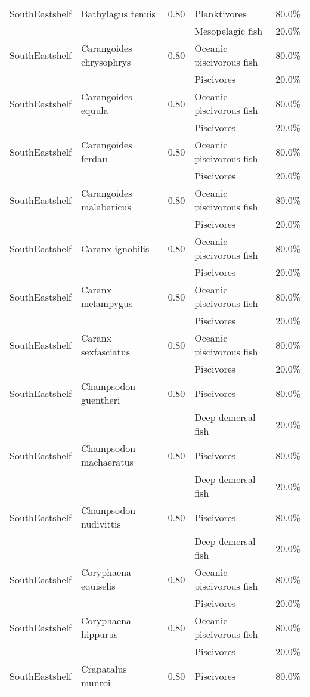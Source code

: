 \begin{longtable}{llcll}
\hline
SouthEastshelf & Bathylagus tenuis & 0.80 & Planktivores & 80.0\% \\
& & & Mesopelagic fish & 20.0\% \\
\hline
SouthEastshelf & Carangoides chrysophrys & 0.80 & Oceanic piscivorous fish & 80.0\% \\
& & & Piscivores & 20.0\% \\
\hline
SouthEastshelf & Carangoides equula & 0.80 & Oceanic piscivorous fish & 80.0\% \\
& & & Piscivores & 20.0\% \\
\hline
SouthEastshelf & Carangoides ferdau & 0.80 & Oceanic piscivorous fish & 80.0\% \\
& & & Piscivores & 20.0\% \\
\hline
SouthEastshelf & Carangoides malabaricus & 0.80 & Oceanic piscivorous fish & 80.0\% \\
& & & Piscivores & 20.0\% \\
\hline
SouthEastshelf & Caranx ignobilis & 0.80 & Oceanic piscivorous fish & 80.0\% \\
& & & Piscivores & 20.0\% \\
\hline
SouthEastshelf & Caranx melampygus & 0.80 & Oceanic piscivorous fish & 80.0\% \\
& & & Piscivores & 20.0\% \\
\hline
SouthEastshelf & Caranx sexfasciatus & 0.80 & Oceanic piscivorous fish & 80.0\% \\
& & & Piscivores & 20.0\% \\
\hline
SouthEastshelf & Champsodon guentheri & 0.80 & Piscivores & 80.0\% \\
& & & Deep demersal fish & 20.0\% \\
\hline
SouthEastshelf & Champsodon machaeratus & 0.80 & Piscivores & 80.0\% \\
& & & Deep demersal fish & 20.0\% \\
\hline
SouthEastshelf & Champsodon nudivittis & 0.80 & Piscivores & 80.0\% \\
& & & Deep demersal fish & 20.0\% \\
\hline
SouthEastshelf & Coryphaena equiselis & 0.80 & Oceanic piscivorous fish & 80.0\% \\
& & & Piscivores & 20.0\% \\
\hline
SouthEastshelf & Coryphaena hippurus & 0.80 & Oceanic piscivorous fish & 80.0\% \\
& & & Piscivores & 20.0\% \\
\hline
SouthEastshelf & Crapatalus munroi & 0.80 & Piscivores & 80.0\% \\

\end{longtable}
